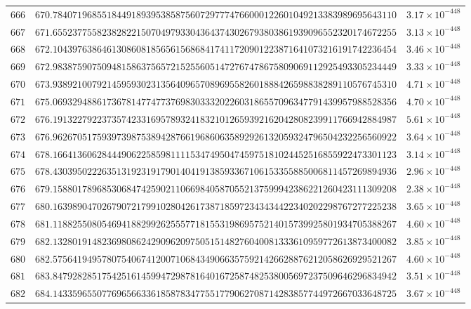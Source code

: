 \documentclass[12pt,reqno]{amsart}
\theoremstyle{remark}
\begin{document}
\begin{longtable}{clc}
$666$ & $670.7840719685518449189395385875607297774766000122601049213383989695643110$ & $3.17\times 10^{-448}$ \\
$667$ & $671.6552377558238282215070497933043643743026793803861939096552320174672255$ & $3.13\times 10^{-448}$ \\
$668$ & $672.1043976386461308608185656156868417411720901223871641073216191742236454$ & $3.46\times 10^{-448}$ \\
$669$ & $672.9838759075094815863756572152556051472767478675809069112925493305234449$ & $3.33\times 10^{-448}$ \\
$670$ & $673.9389210079214595930231356409657089695582601888426598838289110576745310$ & $4.71\times 10^{-448}$ \\
$671$ & $675.0693294886173678147747737698303332022603186557096347791439957988528356$ & $4.70\times 10^{-448}$ \\
$672$ & $676.1913227922373574233169578932418321012659392162042808239911766942884987$ & $5.61\times 10^{-448}$ \\
$673$ & $676.9626705175939739875389428766196860635892926132059324796504232256560922$ & $3.64\times 10^{-448}$ \\
$674$ & $678.1664136062844490622585981111534749504745975181024452516855922473301123$ & $3.14\times 10^{-448}$ \\
$675$ & $678.4303950222635131923191790140419138593367106153355885006811457269894936$ & $2.96\times 10^{-448}$ \\
$676$ & $679.1588017896853068474259021106698405870552137599942386221260423111309208$ & $2.38\times 10^{-448}$ \\
$677$ & $680.1639890470267907217991028042617387185972343434422340202298767277225238$ & $3.65\times 10^{-448}$ \\
$678$ & $681.1188255080546941882992625557718155319869575214015739925801934705388267$ & $4.60\times 10^{-448}$ \\
$679$ & $682.1328019148236980862429096209750515148276040081333610959772613873400082$ & $3.85\times 10^{-448}$ \\
$680$ & $682.5756419495780754067412007106843490663575921426628876212058626929521267$ & $4.60\times 10^{-448}$ \\
$681$ & $683.8479282851754251614599472987816401672587482538005697237509646296834942$ & $3.51\times 10^{-448}$ \\
$682$ & $684.1433596550776965663361858783477551779062708714283857744972667033648725$ & $3.67\times 10^{-448}$ \\

\end{longtable}
\end{document}
